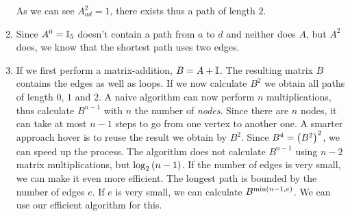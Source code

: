 \documentclass{article}
\begin{document}
\begin{exercise}
\begin{answer}
\begin{enumerate}
 As we can see $A_{ad}^2=1$, there exists thus a path of length $2$.
 \item Since $A^0=\mathbb{I}_5$ doesn't contain a path from $a$ to $d$ and neither does $A$, but $A^2$ does, we know that the shortest path uses two edges.
 \item If we first perform a matrix-addition, $B=A+\mathbb{I}$. The resulting matrix $B$ contains the edges as well as loops. If we now calculate $B^2$ we obtain all paths of length $0$, $1$ and $2$. A naive algorithm can now perform $n$ multiplications, thus calculate $B^{n-1}$ with $n$ the number of \emph{nodes}. Since there are $n$ nodes, it can take at most $n-1$ steps to go from one vertex to another one. A smarter approach hover is to reuse the result we obtain by $B^2$. Since $B^4=\left( B^2 \right)^2$, we can speed up the process. The algorithm does not calculate $B^{n-1}$ using $n-2$ matrix multiplications, but $\log_2\left( n-1 \right)$. If the number of edges is very small, we can make it even more efficient. The longest path is bounded by the number of edges $e$. If $e$ is very small, we can calculate $B^{\min\left( n-1,e \right)}$. We can use our efficient algorithm for this.
\end{enumerate}
\end{answer}
\end{exercise}
\end{document}
